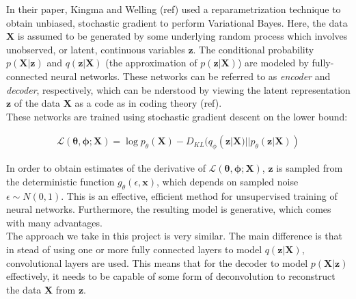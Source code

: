 In their paper, Kingma and Welling (ref) used a reparametrization technique to obtain unbiased, stochastic gradient to perform Variational Bayes. Here, the data $\mathbf{X}$ is assumed to be generated by some underlying random process which involves unobserved, or latent, continuous variables $\mathbf{z}$. The conditional probability $p(\mathbf{X}|\mathbf{z})$ and $q(\mathbf{z}|\mathbf{X})$ (the approximation of $p(\mathbf{z}|\mathbf{X})$) are modeled by fully-connected neural networks. These networks can be referred to as \textit{encoder} and \textit{decoder}, respectively, which can be nderstood by viewing the latent representation $\mathbf{z}$ of the data $\mathbf{X}$ as a code as in coding theory (ref). \\
These networks are trained using stochastic gradient descent on the lower bound:

\begin{align}
\mathcal{L}(\mathbf{\theta}, \mathbf{\phi}; \mathbf{X}) = \log p_\theta(\mathbf{X}) - D_{KL}(q_\phi(\mathbf{z}|\mathbf{X}) || p_\theta(\mathbf{z}|\mathbf{X}))
\end{align}

In order to obtain estimates of the derivative of $\mathcal{L}(\mathbf{\theta}, \mathbf{\phi}; \mathbf{X})$, $\mathbf{z}$ is sampled from the deterministic function $g_{\theta}(\epsilon,\mathbf{x})$, which depends on sampled noise $\epsilon \sim N(0,1)$. This is an effective, efficient method for unsupervised training of neural networks. Furthermore, the resulting model is generative, which comes with many advantages. \\
The approach we take in this project is very similar. The main difference is that in stead of using one or more fully connected layers to model $q(\mathbf{z}|\mathbf{X})$, convolutional layers are used. This means that for the decoder to model $p(\mathbf{X}|\mathbf{z})$ effectively, it needs to be capable of some form of deconvolution to reconstruct the data $\mathbf{X}$ from $\mathbf{z}$. 

